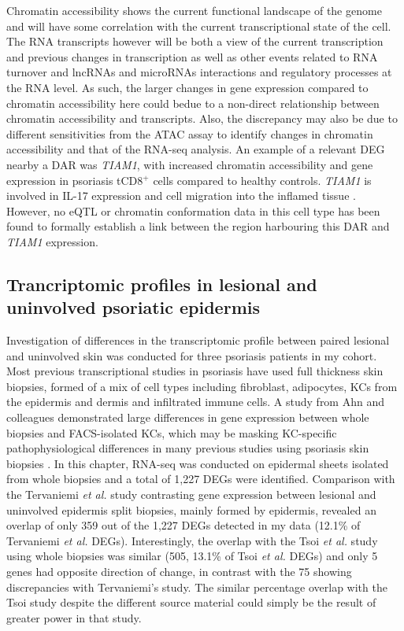 Chromatin accessibility shows the current functional landscape of the genome and will have some correlation with the current transcriptional state of the cell. The RNA transcripts however will be both a view of the current transcription and previous changes in transcription as well as other events related to RNA turnover and lncRNAs and microRNAs interactions and regulatory processes at the RNA level. As such, the larger changes in gene expression compared to chromatin accessibility here could bedue to a non-direct relationship between chromatin accessibility and transcripts. Also, the discrepancy may also be due to different sensitivities from the ATAC assay to identify changes in chromatin accessibility and that of the RNA-seq analysis.
An example of a relevant DEG nearby a DAR was \textit{TIAM1}, with increased chromatin accessibility and gene expression in psoriasis tCD8$^+$ cells compared to healthy controls. \textit{TIAM1} is involved in IL-17 expression and cell migration into the inflamed tissue \parencite{Kurdi2016, Gerard2009}.  However, no eQTL or chromatin conformation data in this cell type has been found to formally establish a link between the region harbouring this DAR and \textit{TIAM1} expression.


\subsection{Trancriptomic profiles in lesional and uninvolved psoriatic epidermis}
Investigation of differences in the transcriptomic profile between paired lesional and uninvolved skin was conducted for three psoriasis patients in my cohort. Most previous transcriptional studies in psoriasis have used full thickness skin biopsies, formed of a mix of cell types including fibroblast, adipocytes, KCs from the epidermis and dermis and infiltrated immune cells. A study from Ahn and colleagues demonstrated large differences in gene expression between whole biopsies and FACS-isolated KCs, which may be masking KC-specific pathophysiological differences in many previous studies using psoriasis skin biopsies \parencite{Ahn2016}. In this chapter, RNA-seq was conducted on epidermal sheets isolated from whole biopsies and a total of 1,227 DEGs were identified. 
Comparison with the Tervaniemi \textit{et al.} study contrasting gene expression between lesional and uninvolved epidermis split biopsies, mainly formed by epidermis, revealed an overlap of only 359 out of the 1,227 DEGs detected in my data (12.1\% of Tervaniemi \textit{et al.} DEGs). Interestingly, the overlap with the Tsoi \textit{et al.} study using whole biopsies was similar (505, 13.1\% of Tsoi \textit{et al.} DEGs) and only 5 genes had opposite direction of change, in contrast with the 75 showing discrepancies with Tervaniemi’s study.  The similar percentage overlap with the Tsoi study despite the different source material could simply be the result of greater power in that study. 


